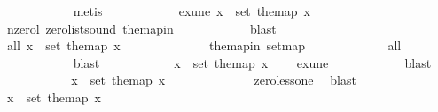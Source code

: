 \begin{isabellebody}
\ \ \ \ \ \ \ \ \ \ \isamarkupfalse%
\ metis\ \ \isanewline
\ \ \ \ \ \ \ \ \isamarkupfalse%
\ exune{\isacharcolon}{\kern0pt}\ {\isachardoublequoteopen}{\isasymexists}x\ {\isasymin}\ set\ the{\isacharunderscore}{\kern0pt}map{\isachardot}{\kern0pt}\ x\ \ {\isasymnoteq}\ {}{\isachardoublequoteclose}\ \isamarkupfalse%
\ n{\isacharunderscore}{\kern0pt}zero{\isacharunderscore}{\kern0pt}l\ zero{\isacharunderscore}{\kern0pt}list{\isacharunderscore}{\kern0pt}sound\ the{\isacharunderscore}{\kern0pt}map{\isacharunderscore}{\kern0pt}in\isanewline
\ \ \ \ \ \ \ \ \ \ \isamarkupfalse%
\ blast\isanewline
\ \ \ \ \ \ \ \ \isamarkupfalse%
\ all{}{}{\isacharunderscore}{\kern0pt}{}{\isacharcolon}{\kern0pt}\ {\isachardoublequoteopen}{\isasymforall}x\ {\isasymin}\ set\ the{\isacharunderscore}{\kern0pt}map{\isachardot}{\kern0pt}\ x\ {\isasymin}\ {\isacharbraceleft}{\kern0pt}{}{\isacharcomma}{\kern0pt}{}{\isacharbraceright}{\kern0pt}{\isachardoublequoteclose}\isanewline
\ \ \ \ \ \ \ \ \ \ \isamarkupfalse%
\ the{\isacharunderscore}{\kern0pt}map{\isacharunderscore}{\kern0pt}in\ set{\isacharunderscore}{\kern0pt}map\ \isanewline
\ \ \ \ \ \ \ \ \ \ \isamarkupfalse%
\ all{}\ \isanewline
\ \ \ \ \ \ \ \ \ \ \isamarkupfalse%
\ blast\isanewline
\ \ \ \ \ \ \ \ \isamarkupfalse%
\ \isamarkupfalse%
\ {\isachardoublequoteopen}{\isasymexists}x\ {\isasymin}\ set\ the{\isacharunderscore}{\kern0pt}map{\isachardot}{\kern0pt}\ x\ {\isacharequal}{\kern0pt}\ {}{\isachardoublequoteclose}\ \isamarkupfalse%
\ exune\isanewline
\ \ \ \ \ \ \ \ \ \ \isamarkupfalse%
\ blast\ \isanewline
\ \ \ \ \ \ \ \ \isamarkupfalse%
\ \isamarkupfalse%
\ {\isachardoublequoteopen}{\isasymexists}x\ {\isasymin}\ set\ the{\isacharunderscore}{\kern0pt}map{\isachardot}{\kern0pt}\ x\ {\isachargreater}{\kern0pt}\ {}{\isachardoublequoteclose}\isanewline
\ \ \ \ \ \ \ \ \ \ \isamarkupfalse%
\ zero{\isacharunderscore}{\kern0pt}less{\isacharunderscore}{\kern0pt}one\ \isamarkupfalse%
\ blast\ \isanewline
\ \ \ \ \ \ \ \ \isamarkupfalse%
\ \isamarkupfalse%
\ {\isachardoublequoteopen}{\isasymforall}x\ {\isasymin}\ set\ the{\isacharunderscore}{\kern0pt}map{\isachardot}{\kern0pt}\ x\ {\isasymge}\ {}{\isachardoublequoteclose}\ \isamarkupfalse%

\end{isabellebody}
